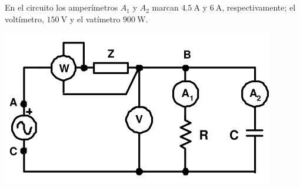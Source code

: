 \documentclass[12pt]{article}
\begin{document}
\clearpage

\section{}





En el circuito los amperímetros $A_1$ y $A_2$ marcan $\SI{4.5}{\ampere}$ y $\SI{6}{\ampere}$, respectivamente; el voltímetro, $\SI{150}{\volt}$ y el
vatímetro $\SI{900}{\watt}$.

\begin{center}
  \includegraphics{figs/circuitoZ.pdf}
\end{center}
\end{document}
